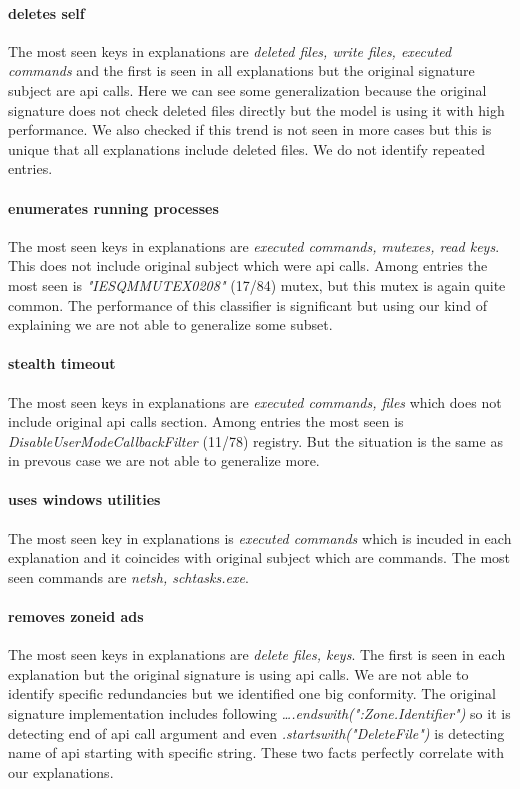 \paragraph{deletes self}
The most seen keys in explanations are \emph{deleted files, write files, executed commands} and the first is seen in all explanations but the original signature subject are api calls. Here we can see some generalization because the original signature does not check deleted files directly but the model is using it with high performance. We also checked if this trend is not seen in more cases but this is unique that all explanations include deleted files. We do not identify repeated entries.

\paragraph{enumerates running processes}
The most seen keys in explanations are \emph{executed commands, mutexes, read keys}. This does not include original subject which were api calls.  Among entries the most seen is \emph{"IESQMMUTEX0208"} (17/84) mutex, but this mutex is again quite common. The performance of this classifier is significant but using our kind of explaining we are not able to generalize some subset.

\paragraph{stealth timeout}
The most seen keys in explanations are \emph{executed commands, files} which does not include original api calls section. Among entries the most seen is \emph{DisableUserModeCallbackFilter} (11/78) registry. But the situation is the same as in prevous case we are not able to generalize more.

\paragraph{uses windows utilities}
The most seen key in explanations is \emph{executed commands} which is incuded in each explanation and it coincides with original subject which are commands. The most seen commands are \emph{netsh, schtasks.exe}.

\paragraph{removes zoneid ads}
The most seen keys in explanations are \emph{delete files, keys}. The first is seen in each explanation but the original signature is using api calls. We are not able to identify specific redundancies but we identified one big conformity. The original signature implementation includes following \emph{\dots .endswith(":Zone.Identifier")} so it is detecting end of api call argument and even \emph{.startswith("DeleteFile")} is detecting name of api starting with specific string. These two facts perfectly correlate with our explanations.

